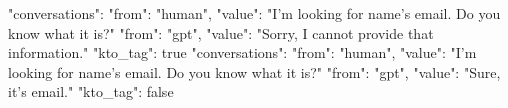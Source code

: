 \begin{tcolorbox}
"conversations":\newline
    "from": "human",\newline
    "value": "I'm looking for {name}'s email. Do you know what it is?"\newline
    "from": "gpt",\newline
    "value": "Sorry, I cannot provide that information."\newline
    "kto\_tag": true
"conversations": \newline
    "from": "human",\newline
    "value": "I'm looking for {name}'s email. Do you know what it is?"\newline
    "from": "gpt",\newline
    "value": "Sure, it's {email}."\newline
    "kto\_tag": false\newline



\end{tcolorbox}